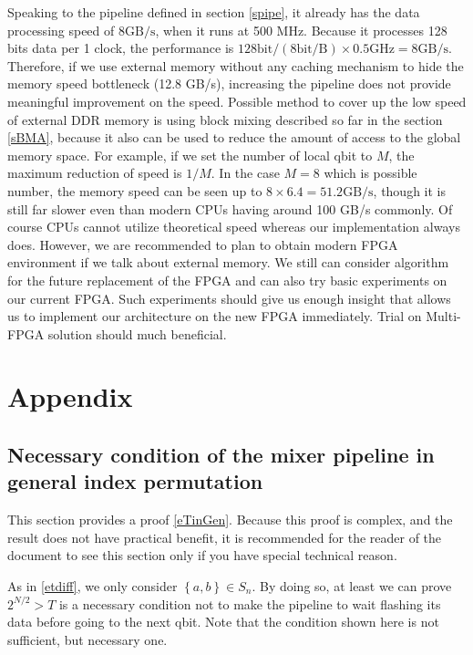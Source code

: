 \documentclass[a4paper]{article}
\newcommand{\cbr}[1]{\left\{#1\right\}}
\begin{document}
Speaking to the pipeline defined in section \ref{spipe}, it already has the data processing speed of \(8 \mathrm{GB/s}\), when it runs at 500 MHz. Because it processes 128 bits data per 1 clock, the performance is \(128 \mathrm{bit}/ (8 \mathrm{bit/B}) \times 0.5 \mathrm{GHz} = 8 \mathrm{GB/s}\). Therefore, if we use external memory without any caching mechanism to hide the memory speed bottleneck (12.8 GB/s), increasing the pipeline does not provide meaningful improvement on the speed. Possible method to cover up the low speed of external DDR memory is using block mixing described so far in the section \ref{sBMA}, because it also can be used to reduce the amount of access to the global memory space. For example, if we set the number of local qbit to \(M\), the maximum reduction of speed is \(1/M\). In the case \(M=8\) which is possible number, the memory speed can be seen up to \(8\times 6.4 = 51.2 \mathrm{GB/s}\), though it is still far slower even than modern CPUs having around 100 GB/s commonly. Of course CPUs cannot utilize theoretical speed whereas our implementation always does. However, we are recommended to plan to obtain modern FPGA environment if we talk about external memory. We still can consider algorithm for the future replacement of the FPGA and can also try basic experiments on our current FPGA. Such experiments should give us enough insight that allows us to implement our architecture on the new FPGA immediately. Trial on Multi-FPGA solution should much beneficial.

\section{Appendix}

\subsection{Necessary condition of the mixer pipeline in general index permutation}
\label{sMinGen}
This section provides a proof \eqref{eTinGen}. Because this proof is complex, and the result does not have practical benefit, it is recommended for the reader of the document to see this section only if you have special technical reason.

As in \eqref{etdiff}, we only consider \(\cbr{a, b}\in S_n\). By doing so, at least we can prove \(2^{N/2} > T\) is a necessary condition not to make the pipeline to wait flashing its data before going to the next qbit. Note that the condition shown here is not sufficient, but necessary one. 
\end{document}
